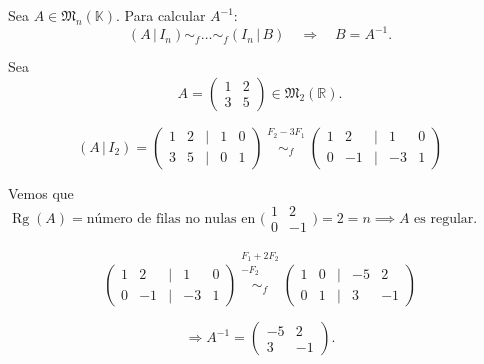 \documentclass[a4paper,12pt]{article}
\begin{document}
\begin{procedimiento}[title=Cálculo de la inversa de una matriz]
Sea $A \in \mathfrak{M}_n(\mathbb{K})$. Para calcular $A^{-1}$:
\[
(A \,|\, I_n) \sim_f \dots \sim_f (I_n \,|\, B)
\quad \Rightarrow \quad B = A^{-1}.
\]
\end{procedimiento}

\begin{ejemplo}[title=Ejemplo de cálculo de $A^{-1}$ en $\mathbb{R}$]
Sea
\[
A =
\begin{pmatrix}
1 & 2 \\
3 & 5
\end{pmatrix} \in \mathfrak{M}_2(\mathbb{R}).
\]

\[
(A\,|\,I_2) =
\begin{pmatrix}
1 & 2 & \Big| & 1 & 0 \\
3 & 5 & \Big| & 0 & 1
\end{pmatrix}
\overset{\substack{F_2 - 3 F_1 \\{}}}{\sim_f}
\begin{pmatrix}
1 & 2 & \Big| & 1 & 0 \\
0 & -1 & \Big| & -3 & 1
\end{pmatrix}
\]

Vemos que $\operatorname{Rg}(A) = \text{número de filas no nulas en } 
\bigl(\!\begin{smallmatrix} 1 & 2 \\ 0 & -1 \end{smallmatrix}\!\bigr) 
= 2 = n \implies A \text{ es regular.}$

\[
\begin{pmatrix}
1 & 2 & \Big| & 1 & 0 \\
0 & -1 & \Big| & -3 & 1
\end{pmatrix}
\overset{\substack{F_1 + 2 F_2 \\ -F_2 \\{}}}{\sim_f}
\begin{pmatrix}
1 & 0 & \Big| & -5 & 2 \\
0 & 1 & \Big| & 3 & -1
\end{pmatrix}
\]

\[
\Rightarrow A^{-1} =
\begin{pmatrix}
-5 & 2 \\
3 & -1
\end{pmatrix}.
\]
\end{ejemplo}
\end{document}
